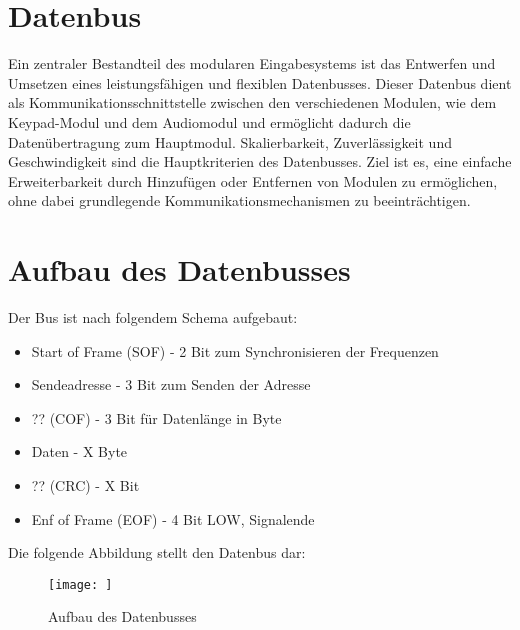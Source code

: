 \section{Datenbus}
Ein zentraler Bestandteil des modularen Eingabesystems ist das Entwerfen und Umsetzen eines leistungsfähigen und flexiblen Datenbusses. Dieser Datenbus dient als Kommunikationsschnittstelle zwischen den verschiedenen Modulen, wie dem Keypad-Modul und dem Audiomodul und ermöglicht dadurch die Datenübertragung zum Hauptmodul. Skalierbarkeit, Zuverlässigkeit und Geschwindigkeit sind die Hauptkriterien des Datenbusses. Ziel ist es, eine einfache Erweiterbarkeit durch Hinzufügen oder Entfernen von Modulen zu ermöglichen, ohne dabei grundlegende Kommunikationsmechanismen zu beeinträchtigen.

\section{Aufbau des Datenbusses}
Der Bus ist nach folgendem Schema aufgebaut:
\begin{itemize}
    \item Start of Frame (SOF) - 2 Bit zum Synchronisieren der Frequenzen
    \item Sendeadresse -  3 Bit zum Senden der Adresse
    \item ?? (COF) - 3 Bit für Datenlänge in Byte
    \item Daten - X Byte
    \item ?? (CRC) - X Bit
    \item Enf of Frame (EOF) - 4 Bit LOW, Signalende
\end{itemize}

Die folgende Abbildung stellt den Datenbus dar:
\begin{figure}[H]
    \centering    
    \texttt{[image: ]}
    \caption{Aufbau des Datenbusses}
    \label{Datenbus}
\end{figure}
